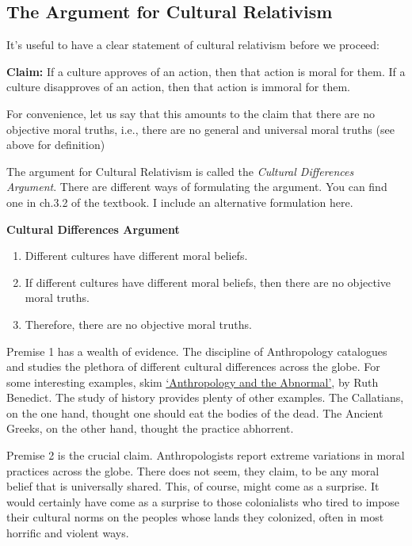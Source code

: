 \documentclass[]{article}
\begin{document}
\subsection{The Argument for Cultural
Relativism}\label{the-argument-for-cultural-relativism}

It's useful to have a clear statement of cultural relativism before we
proceed:

\textbf{Claim:} If a culture approves of an action, then that action is
moral for them. If a culture disapproves of an action, then that action
is immoral for them.

For convenience, let us say that this amounts to the claim that there
are no objective moral truths, i.e., there are no general and universal
moral truths (see above for definition)

The argument for Cultural Relativism is called the \emph{Cultural
Differences Argument}. There are different ways of formulating the
argument. You can find one in ch.3.2 of the textbook. I include an
alternative formulation here.

\textbf{Cultural Differences Argument}

\begin{enumerate}
\def\labelenumi{\arabic{enumi}.}
\itemsep1pt\parskip0pt
\item
  Different cultures have different moral beliefs.
\item
  If different cultures have different moral beliefs, then there are no
  objective moral truths.
\item
  Therefore, there are no objective moral truths.
\end{enumerate}

Premise 1 has a wealth of evidence. The discipline of Anthropology
catalogues and studies the plethora of different cultural differences
across the globe. For some interesting examples, skim
\href{Benedict.pdf}{`Anthropology and the Abnormal'}, by Ruth Benedict.
The study of history provides plenty of other examples. The Callatians,
on the one hand, thought one should eat the bodies of the dead. The
Ancient Greeks, on the other hand, thought the practice abhorrent.

Premise 2 is the crucial claim. Anthropologists report extreme
variations in moral practices across the globe. There does not seem,
they claim, to be any moral belief that is universally shared. This, of
course, might come as a surprise. It would certainly have come as a
surprise to those colonialists who tired to impose their cultural norms
on the peoples whose lands they colonized, often in most horrific and
violent ways.
\end{document}
